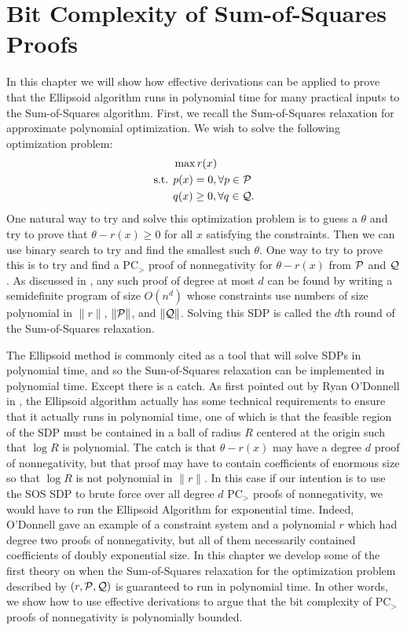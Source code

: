 \chapter{Bit Complexity of Sum-of-Squares Proofs}\label{cha:bit_complexity}
In this chapter we will show how effective derivations can be applied to prove that the Ellipsoid algorithm runs in polynomial time for many practical inputs to the Sum-of-Squares algorithm. First, we recall the Sum-of-Squares relaxation for approximate polynomial optimization. We wish to solve the following optimization problem:
\begin{align*}
&\max r(x)\\
\text{s.t. } &p(x) = 0, \forall p \in \mathcal P \\
&q(x) \geq 0, \forall q \in \mathcal Q.
\end{align*}
One natural way to try and solve this optimization problem is to guess a $\theta$ and try to prove that $\theta - r(x) \geq 0$ for all $x$ satisfying the constraints. Then we can use binary search to try and find the smallest such $\theta$. One way to try to prove this is to try and find a PC$_>$ proof of nonnegativity for $\theta - r(x)$ from $\mathcal P$ and $\mathcal Q$. As discussed in , any such proof of degree at most $d$ can be found by writing a semidefinite program of size $O(n^d)$ whose constraints use numbers of size polynomial in $\|r\|$, $\|\mathcal P\|$, and $\|\mathcal Q\|$. Solving this SDP is called the $d$th round of the Sum-of-Squares relaxation. 

The Ellipsoid method is commonly cited as a tool that will solve SDPs in polynomial time, and so the Sum-of-Squares relaxation can be implemented in polynomial time. Except there is a catch. As first pointed out by Ryan O'Donnell in \cite{ODon16}, the Ellipsoid algorithm actually has some technical requirements to ensure that it actually runs in polynomial time, one of which is that the feasible region of the SDP must be contained in a ball of radius $R$ centered at the origin such that $\log R$ is polynomial. The catch is that $\theta - r(x)$ may have a degree $d$ proof of nonnegativity, but that proof may have to contain coefficients of enormous size so that $\log R$ is not polynomial in $\|r\|$. In this case if our intention is to use the SOS SDP to brute force over all degree $d$ PC$_>$ proofs of nonnegativity, we would have to run the Ellipsoid Algorithm for exponential time. Indeed, O'Donnell gave an example of a constraint system and a polynomial $r$ which had degree two proofs of nonnegativity, but all of them necessarily contained coefficients of doubly exponential size. In this chapter we develop some of the first theory on when the Sum-of-Squares relaxation for the optimization problem described by $(r, \mathcal P,\mathcal Q)$ is guaranteed to run in polynomial time. In other words, we show how to use effective derivations to argue that the bit complexity of PC$_>$ proofs of nonnegativity is polynomially bounded. 

